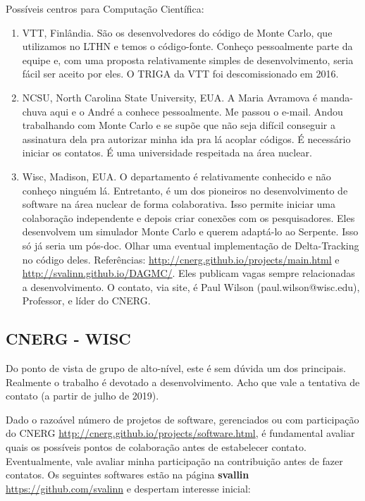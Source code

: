 Possíveis centros para Computação Científica:
\begin{enumerate}
	\item VTT, Finlândia. São os desenvolvedores do código de Monte Carlo, que utilizamos no LTHN e temos o código-fonte. Conheço pessoalmente parte da equipe e, 
	com uma proposta relativamente simples de desenvolvimento, seria fácil ser aceito por eles. O TRIGA da VTT foi descomissionado em 2016.
	\item NCSU, North Carolina State University, EUA. A Maria Avramova é manda-chuva aqui e o André a conhece pessoalmente. Me passou o e-mail. Andou trabalhando com Monte Carlo e se supõe que não seja difícil conseguir a assinatura dela pra autorizar minha ida pra lá acoplar códigos. É necessário iniciar os contatos. É uma universidade respeitada na área nuclear.
	\item Wisc, Madison, EUA. O departamento é relativamente conhecido e não conheço ninguém lá. Entretanto, é um dos pioneiros no desenvolvimento de software na área nuclear de forma colaborativa. Isso permite iniciar uma colaboração independente e depois criar conexões com os pesquisadores. Eles desenvolvem um simulador Monte Carlo e querem adaptá-lo ao Serpente. Isso só já seria um pós-doc. Olhar uma eventual implementação de Delta-Tracking no código deles. Referências: \url{http://cnerg.github.io/projects/main.html} e \url{http://svalinn.github.io/DAGMC/}. Eles publicam vagas sempre relacionadas a desenvolvimento. O contato, via site, é Paul Wilson (paul.wilson@wisc.edu), Professor, e líder do CNERG.
	
\end{enumerate}

\subsection{CNERG - WISC}
	Do ponto de vista de grupo de alto-nível, este é sem dúvida um dos principais. Realmente o trabalho é devotado a desenvolvimento. Acho que vale a tentativa de contato (a partir de julho de 2019).
	
	Dado o razoável número de projetos de software, gerenciados ou com participação do CNERG \url{http://cnerg.github.io/projects/software.html}, é fundamental avaliar quais os possíveis pontos de colaboração antes de estabelecer contato. Eventualmente, vale avaliar minha participação na contribuição antes de fazer contatos. Os seguintes softwares estão na página \textbf{svallin} \url{https://github.com/svalinn} e despertam interesse inicial:
	

